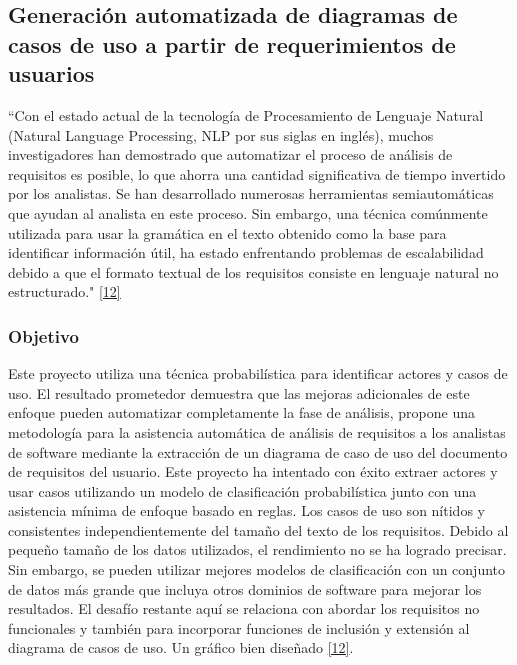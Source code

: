 \subsection{Generación automatizada de diagramas de casos de uso a partir de requerimientos de usuarios}

``Con el estado actual de la tecnología de Procesamiento de Lenguaje Natural (Natural Language Processing, NLP por sus siglas en inglés), muchos investigadores han demostrado que automatizar el proceso de análisis de requisitos es posible, lo que ahorra una cantidad significativa de tiempo invertido por los analistas. Se han desarrollado numerosas herramientas semiautomáticas que ayudan al analista en este proceso. Sin embargo, una técnica comúnmente utilizada para usar la gramática en el texto obtenido como la base para identificar información útil, ha estado enfrentando problemas de escalabilidad debido a que el formato textual de los requisitos consiste en lenguaje natural no estructurado." \hyperlink{b12}{[12]}

\subsubsection{Objetivo}
Este proyecto utiliza una técnica probabilística para identificar actores y casos de uso. El resultado prometedor demuestra que las mejoras adicionales de este enfoque pueden automatizar completamente la fase de análisis, propone una metodología para la asistencia automática de análisis de requisitos a los analistas de software mediante la extracción de un diagrama de caso de uso del documento de requisitos del usuario.
Este proyecto ha intentado con éxito extraer actores y usar casos utilizando un modelo de clasificación probabilística junto con una asistencia mínima de enfoque basado en reglas. Los casos de uso son nítidos y consistentes independientemente del tamaño del texto de los requisitos. Debido al pequeño tamaño de los datos utilizados, el rendimiento no se ha logrado precisar. Sin embargo, se pueden utilizar mejores modelos de clasificación con un conjunto de datos más grande que incluya otros dominios de software para mejorar los resultados. El desafío restante aquí se relaciona con abordar los requisitos no funcionales y también para incorporar funciones de inclusión y extensión al diagrama de casos de uso. Un gráfico bien diseñado \hyperlink{b12}{[12]}.